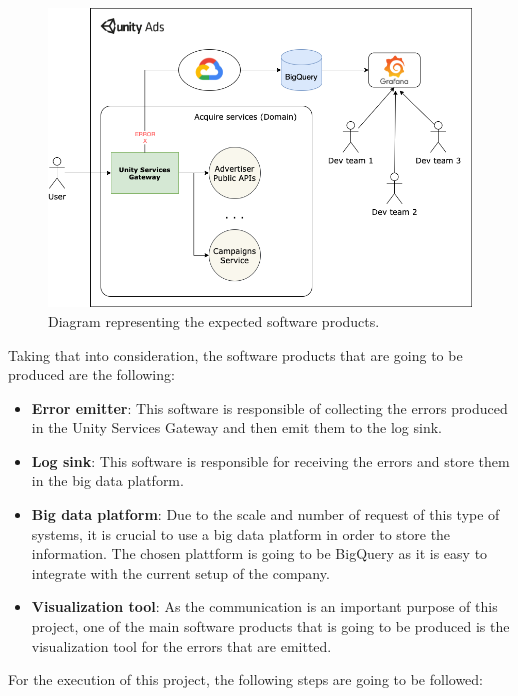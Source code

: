 \documentclass[12pt]{article}
\begin{document}
\begin{figure}[h]
    \centering
    \includegraphics[scale=0.25]{src/proposal/img/Unity Services Gateway - project.png}
    \caption{Diagram representing the expected software products.}
    \label{fig:project-outcome}
\end{figure}

Taking that into consideration, the software products that are going to be produced are the following:

\begin{itemize}
    \item \textbf{Error emitter}: This software is responsible of collecting the errors produced in the Unity Services Gateway and then emit them to the log sink.
    \item \textbf{Log sink}: This software is responsible for receiving the errors and store them in the big data platform.
    \item \textbf{Big data platform}: Due to the scale and number of request of this type of systems, it is crucial to use a big data platform in order to store the information. The chosen plattform is going to be BigQuery as it is easy to integrate with the current setup of the company.
    \item \textbf{Visualization tool}: As the communication is an important purpose of this project, one of the main software products that is going to be produced is the visualization tool for the errors that are emitted.
\end{itemize}

For the execution of this project, the following steps are going to be followed:\\
\end{document}
